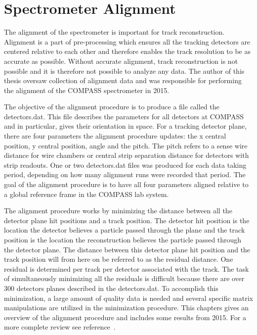 \chapter{Spectrometer Alignment} \label{ch::alignment}
\ifpdf
\graphicspath{{Chapters/Alignment/Figs/Raster/}{Chapters/Alignment/Figs/PDF/}{Chapters/Alignment/Figs/}}
\else \graphicspath{{Chapters/Alignment/Figs/Vector/}{Chapters/Alignment/Figs/}}
\fi

The alignment of the spectrometer is important for track reconstruction.
Alignment is a part of pre-processing which ensures all the tracking detectors
are centered relative to each other and therefore enables the track resolution
to be as accurate as possible.  Without accurate alignment, track reconstruction
is not possible and it is therefore not possible to analyze any data.  The
author of this thesis oversaw collection of alignment data and was
responsible for performing the alignment of the COMPASS spectrometer in 2015.

The objective of the alignment procedure is to produce a file called the
detectors.dat.  This file describes the parameters for all detectors at COMPASS
and in particular, gives their orientation in space.  For a tracking detector
plane, there are four parameters the alignment procedure updates: the x central
position, y central position, angle and the pitch.  The pitch refers to a sense
wire distance for wire chambers or central strip separation distance for
detectors with strip readouts.  One or two detectors.dat files was produced for
each data taking period, depending on how many alignment runs were recorded that
period.  The goal of the alignment procedure is to have all four parameters
aligned relative to a global reference frame in the COMPASS lab system.

The alignment procedure works by minimizing the distance between all the
detector plane hit positions and a track position.  The detector hit position is
the location the detector believes a particle passed through the plane and the
track position is the location the reconstruction believes the particle passed
through the detector plane.  The distance between this detector plane hit
position and the track position will from here on be referred to as the residual
distance.  One residual is determined per track per detector associated with the
track.  The task of simultaneously minimizing all the residuals is difficult
because there are over 300 detectors planes described in the detectors.dat.  To
accomplish this minimization, a large amount of quality data is needed and
several specific matrix manipulations are utilized in the minimization
procedure.  This chapters gives an overview of the alignment procedure and
includes some results from 2015.  For a more complete review see
reference~\cite{compassAlignmentNote}.


